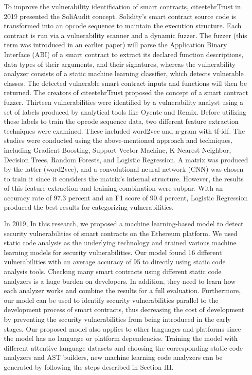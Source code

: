 To improve the vulnerability identification of smart contracts, citeetehrTrust in 2019 presented the SoliAudit concept.
Solidity's smart contract source code is transformed into an opcode sequence to maintain the execution structure.
Each contract is run via a vulnerability scanner and a dynamic fuzzer.
The fuzzer (this term was introduced in an earlier paper) will parse the Application Binary Interface (ABI) of a smart contract to extract its declared function descriptions, data types of their arguments, and their signatures, whereas the vulnerability analyzer consists of a static machine learning classifier, which detects vulnerable classes.
The detected vulnerable smart contract inputs and functions will then be returned.
The creators of citeetehrTrust proposed the concept of a smart contract fuzzer.
Thirteen vulnerabilities were identified by a vulnerability analyst using a set of labels produced by analytical tools like Oyente and Remix.
Before utilizing these labels to train the opcode sequence data, two different feature extraction techniques were examined. These included word2vec and n-gram with tf-idf.
The studies were conducted using the above-mentioned approach and techniques, including Gradient Boosting, Support Vector Machine, K-Nearest Neighbor, Decision Trees, Random Forests, and Logistic Regression.
A matrix was produced by the latter (word2vec), and a convolutional neural network (CNN) was chosen to train it since it considers the matrix's internal structure.
However, the results of this feature extraction and training combination were subpar.
With an accuracy rate of 97.3 percent and an F1 score of 90.4 percent, Logistic Regression produced the best results for categorizing vulnerabilities.

In 2019, In this research, we proposed a machine learning-based
model to detect security vulnerabilities of smart contracts
on the Ethereum platform. We used static code analysis as
the underlying technology and trained various machine
learning models for security vulnerabilities. Our
model found 16 different vulnerabilities with an
average accuracy of 95%
to directly using static code analysis tools. Checking many smart contracts using different static code analyzers
is a huge burden on developers. In addition, they need to learn
how each analyzer works and combine the results for a full
evaluation. Furthermore, our model can be used to identify
security vulnerabilities parallel to the development process
of smart contracts, thus decreasing the cost of development
by preventing the security vulnerabilities from being introduced
in the early stages. Our proposed model also applies to
other languages and platforms since the model has no language
or platform dependencies. Training the model
with different attentive language datasets and choosing
the corresponding static code analyzers and AST builders,
new machine learning code analyzers can be generated by
following the steps described in Section III.

